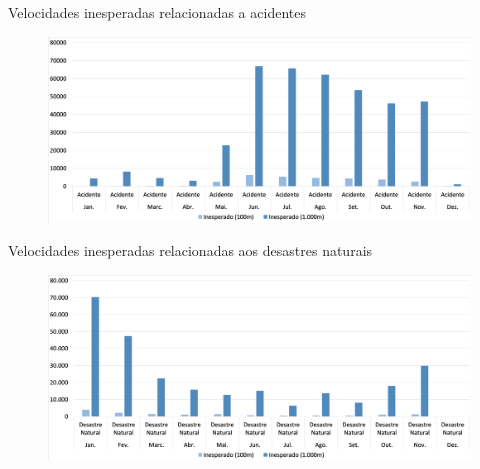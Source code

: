 \documentclass{beamer}
\begin{document}
\begin{frame}{Velocidades inesperadas relacionadas a acidentes}
    \begin{figure}[!htb]
	\centering
		\includegraphics[width=1\linewidth]{apriori_analysis_shapes_accidents_.png}
	\label{fig:apriori_analysis_shapes_accidents}
\end{figure}
\end{frame}
\begin{frame}{Velocidades inesperadas relacionadas aos desastres naturais}
    \begin{figure}[!htb]
	\centering
		\includegraphics[width=1\linewidth]{apriori_analysis_shapes_natural_disasters_.png}
	\label{fig:apriori_analysis_shapes_natural_disasters}
\end{figure}
\end{frame}
\end{document}
